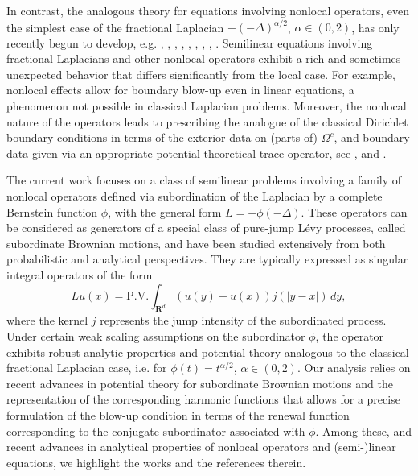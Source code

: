 \documentclass[a4paper,12pt,draft]{article}
\theoremstyle{plain}
\theoremstyle{definition}
\numberwithin{equation}{section}
\newcommand{\1}{1}
\begin{document}
In contrast, the analogous theory for equations involving nonlocal operators, even the simplest case of the fractional Laplacian $-(-\Delta)^{\alpha/2}$, $\alpha\in(0,2)$, has only recently begun to develop, e.g. \cite{CFQ}, \cite{FQ}, \cite{benchrouda}, \cite{abatangelo1}, \cite{abatangelo2}, \cite{BJK}, \cite{BVW}, \cite{klimsiak}, \cite{klimsiak25}. Semilinear equations involving fractional Laplacians and other nonlocal operators exhibit a rich and sometimes unexpected behavior that differs significantly from the local case. For example, nonlocal effects allow for boundary blow-up even in linear equations, a phenomenon not possible in classical Laplacian problems. Moreover,
the nonlocal nature of the operators leads to prescribing the analogue of the classical Dirichlet boundary conditions in terms of the exterior data on (parts of) $\Omega^c$, and boundary data given via an appropriate potential-theoretical trace operator, see \cite{BJK}, \cite{Bio} and \cite{BVW}.


 
The current work focuses on a class of semilinear problems involving a family of nonlocal operators defined via subordination of the Laplacian by a complete Bernstein function $\phi$, with the general form \( L = -\phi(-\Delta) \). These operators can be considered as generators of a special class of pure-jump Lévy processes, called subordinate Brownian motions, and have been studied extensively from both probabilistic and analytical perspectives. They are typically expressed as singular integral operators of the form
\[
Lu(x) = \text{P.V.} \int_{\mathbf{R}^d} (u(y) - u(x))j(|y - x|)\, dy,
\]
where the kernel \(j\) represents the jump intensity of the subordinated process. Under certain weak scaling assumptions on the subordinator $\phi$, the operator exhibits robust analytic properties and potential theory analogous to the classical fractional Laplacian case, i.e. for \( \phi(t) = t^{\alpha/2} \), $\alpha\in(0,2)$.
Our analysis relies on recent advances in potential theory for subordinate Brownian motions and the representation of the corresponding harmonic functions that allows for a precise formulation of the blow-up condition in terms of the renewal function corresponding to the conjugate subordinator associated with $\phi$. Among these, and recent advances in analytical properties of nonlocal operators and {(semi-)linear} equations, we highlight the works \cite{BKK, BJK, Bio, BVW, KKLL, GKL, BJ} and the references therein.
\end{document}
